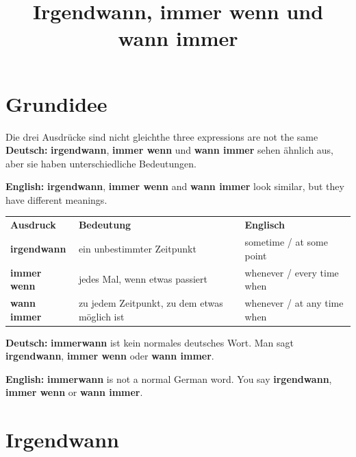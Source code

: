 \documentclass[a4paper,11pt]{article}
\title{Irgendwann, immer wenn und wann immer}
\date{}
\newcommand{\GermanText}[1]{\textbf{Deutsch: }#1\par}
\newcommand{\EnglishText}[1]{{\small\color{SoftGray}\textbf{English: }#1\par}}
\begin{document}
    \maketitle
    \tableofcontents
    \newpage

\section{Grundidee}

\begin{grammarentry}{Die drei Ausdrücke sind nicht gleich}{the three expressions are not the same}
\GermanText{\textbf{irgendwann}, \textbf{immer wenn} und \textbf{wann immer} sehen ähnlich aus, aber sie haben unterschiedliche Bedeutungen.}
\EnglishText{\textbf{irgendwann}, \textbf{immer wenn} and \textbf{wann immer} look similar, but they have different meanings.}

\begin{center}
\begin{tabular}{>{\bfseries}p{3.5cm}p{5cm}p{5.5cm}}
\rowcolor{HeaderBlueDark}
\color{white}\textbf{Ausdruck} & \color{white}\textbf{Bedeutung} & \color{white}\textbf{Englisch} \\
irgendwann & ein unbestimmter Zeitpunkt & sometime / at some point \\
immer wenn & jedes Mal, wenn etwas passiert & whenever / every time when \\
wann immer & zu jedem Zeitpunkt, zu dem etwas möglich ist & whenever / at any time when \\
\end{tabular}
\end{center}

\GermanText{\textbf{immerwann} ist kein normales deutsches Wort. Man sagt \textbf{irgendwann}, \textbf{immer wenn} oder \textbf{wann immer}.}
\EnglishText{\textbf{immerwann} is not a normal German word. You say \textbf{irgendwann}, \textbf{immer wenn} or \textbf{wann immer}.}
\end{grammarentry}

\section{Irgendwann}
\end{document}
